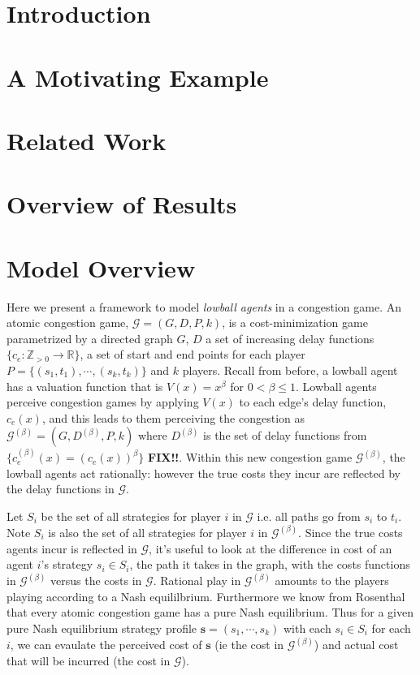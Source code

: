 \documentclass[twoside]{article}
\newcommand{\pbet}{^{(\beta)}}
\newcommand{\fix}{\textbf{FIX!!}}
\begin{document}
\begin{multicols}{2} %

\section{Introduction}

\section{A Motivating Example}

\section{Related Work}

\section{Overview of Results}

\section{Model Overview}

Here we present a framework to model \textit{lowball agents} in a congestion game.  An atomic congestion game, $\mathcal{G} = (G, D, P, k)$, is a cost-minimization game parametrized by a directed graph $G$, $D$ a set of increasing delay functions $\{c_e : \mathbb{Z}_{>0} \to \mathbb{R}\}$, a set of start and end points for each player $P =\{(s_1, t_1), \cdots, (s_k, t_k)\}$ and $k$ players.  Recall from before, a lowball agent has a valuation function that is $V(x) = x^{\beta}$ for $0 < \beta \le 1$.  
Lowball agents perceive congestion games by applying $V(x)$ to each edge's delay function, $c_e(x)$, and this leads to them perceiving the congestion as $\mathcal{G}\pbet= (G, D\pbet, P, k)$ where $D\pbet$ is the set of delay functions from $\{c_e\pbet(x) = (c_e(x))^\beta\}$ \fix.  Within this new congestion game $\mathcal{G}\pbet$, the lowball agents act rationally: however the true costs they incur are reflected by the delay functions in $\mathcal{G}$.   

Let $S_i$ be the set of all strategies for player $i$ in $\mathcal{G}$ i.e. all
paths go from $s_i$ to $t_i$.  Note $S_i$ is also the set of all strategies for
player $i$ in $\mathcal{G}\pbet$.  Since the true costs agents incur is
reflected in $\mathcal{G}$, it's useful to look at the difference in cost of an
agent $i$'s strategy $s_i \in S_i$, the path it takes in the graph, with the
costs functions in $\mathcal{G}\pbet$ versus the costs in $\mathcal{G}$.
Rational play in $\mathcal{G}\pbet$ amounts to the players playing according to
a Nash equililbrium.  Furthermore we know from Rosenthal \cite{Rosenthal1973} that every atomic congestion game has a pure Nash equilibrium.  Thus for a given pure Nash equilibrium strategy profile $\mathbf{s} = (s_1, \cdots, s_k)$ with each $s_i \in S_i$ for each $i$, we can evaulate the perceived cost of $\mathbf{s}$ (ie the cost in $\mathcal{G}\pbet$) and actual cost that will be incurred (the cost in $\mathcal{G}$).


\end{multicols}
\end{document}
